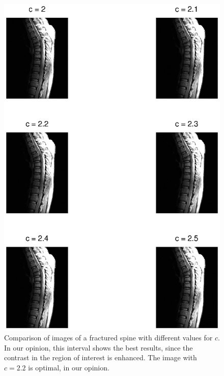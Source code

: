 \begin{figure}[!Htb]
  \centering
  \includegraphics[width=\textwidth]{fracturedSpinesBest.eps}
  \caption{Comparison of images of a fractured spine with different values for \(c\). In our opinion, this interval shows the best results, since the contrast in the region of interest is enhanced. The image with \(c = 2.2\) is optimal, in our opinion.}
  \label{fig:fractured_spines_best}
\end{figure}

\clearpage